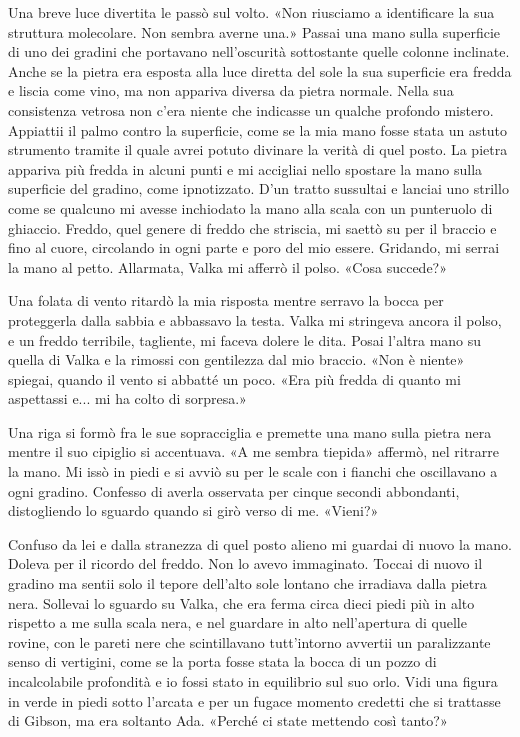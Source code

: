 Una breve luce divertita le passò sul volto. «Non riusciamo a
identificare la sua struttura molecolare. Non sembra averne una.» Passai
una mano sulla superficie di uno dei gradini che portavano nell'oscurità
sottostante quelle colonne inclinate. Anche se la pietra era esposta
alla luce diretta del sole la sua superficie era fredda e liscia come
vino, ma non appariva diversa da pietra normale. Nella sua consistenza
vetrosa non c'era niente che indicasse un qualche profondo mistero.
Appiattii il palmo contro la superficie, come se la mia mano fosse stata
un astuto strumento tramite il quale avrei potuto divinare la verità di
quel posto. La pietra appariva più fredda in alcuni punti e mi accigliai
nello spostare la mano sulla superficie del gradino, come ipnotizzato.
D'un tratto sussultai e lanciai uno strillo come se qualcuno mi avesse
inchiodato la mano alla scala con un punteruolo di ghiaccio. Freddo,
quel genere di freddo che striscia, mi saettò su per il braccio e fino
al cuore, circolando in ogni parte e poro del mio essere. Gridando, mi
serrai la mano al petto. Allarmata, Valka mi afferrò il polso. «Cosa
succede?»

Una folata di vento ritardò la mia risposta mentre serravo la bocca per
proteggerla dalla sabbia e abbassavo la testa. Valka mi stringeva ancora
il polso, e un freddo terribile, tagliente, mi faceva dolere le dita.
Posai l'altra mano su quella di Valka e la rimossi con gentilezza dal
mio braccio. «Non è niente» spiegai, quando il vento si abbatté un poco.
«Era più fredda di quanto mi aspettassi e... mi ha colto di sorpresa.»

Una riga si formò fra le sue sopracciglia e premette una mano sulla
pietra nera mentre il suo cipiglio si accentuava. «A me sembra tiepida»
affermò, nel ritrarre la mano. Mi issò in piedi e si avviò su per le
scale con i fianchi che oscillavano a ogni gradino. Confesso di averla
osservata per cinque secondi abbondanti, distogliendo lo sguardo quando
si girò verso di me. «Vieni?»

Confuso da lei e dalla stranezza di quel posto alieno mi guardai di
nuovo la mano. Doleva per il ricordo del freddo. Non lo avevo
immaginato. Toccai di nuovo il gradino ma sentii solo il tepore
dell'alto sole lontano che irradiava dalla pietra nera. Sollevai lo
sguardo su Valka, che era ferma circa dieci piedi più in alto rispetto a
me sulla scala nera, e nel guardare in alto nell'apertura di quelle
rovine, con le pareti nere che scintillavano tutt'intorno avvertii un
paralizzante senso di vertigini, come se la porta fosse stata la bocca
di un pozzo di incalcolabile profondità e io fossi stato in equilibrio
sul suo orlo. Vidi una figura in verde in piedi sotto l'arcata e per un
fugace momento credetti che si trattasse di Gibson, ma era soltanto Ada.
«Perché ci state mettendo così tanto?»

